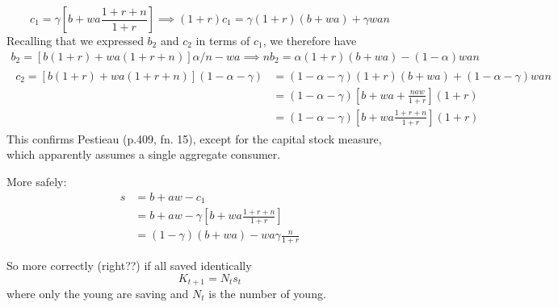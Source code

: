 \documentclass{article}
\begin{document}
\begin{equation}\label{opt c1 a}
c_{1} = \gamma[b + wa\frac{1+r+n} {1+r}] \implies
(1+r)c_{1} = \gamma(1+r)(b + wa) + \gamma wan
\end{equation}
Recalling that we expressed $b_{2}$ and $c_{2}$ in terms of $c_{1}$, we therefore have
\begin{gather}
b_{2} =  [b(1+r) + wa(1+r+n)] \alpha /n - wa \implies nb_{2} = \alpha(1+r)(b+wa) - (1-\alpha)wan
\\
\begin{split}
c_{2} = [b(1+r) + wa(1+r+n)] (1-\alpha-\gamma) &= (1-\alpha-\gamma)(1+r)(b+wa) + (1-\alpha-\gamma)wan
\\
&= (1-\alpha -\gamma)[b+wa+\frac{naw}{1+r}](1+r)
\\
&= (1-\alpha -\gamma)[b+wa\frac{1+r+n}{1+r}](1+r)
\end{split}
\end{gather}
This confirms Pestieau (p.409, fn. 15), except for the capital stock measure,
which apparently assumes a single aggregate consumer.\newline

More safely:
\begin{equation}
\begin{split}
s
&= b + aw - c_{1}
\\
&= b + aw - \gamma[b + wa \frac{1+r+n}{1+r}]
\\
&= (1-\gamma)(b+wa) - wa \gamma \frac{n}{1+r}
\end{split}
\end{equation}

So more correctly (right??) if all saved identically %
\begin{equation}
K_{t+1} = N_{t} s_{t}
\end{equation}
where only the young are saving and $N_{t}$ is the number of young.\newline

\end{document}
